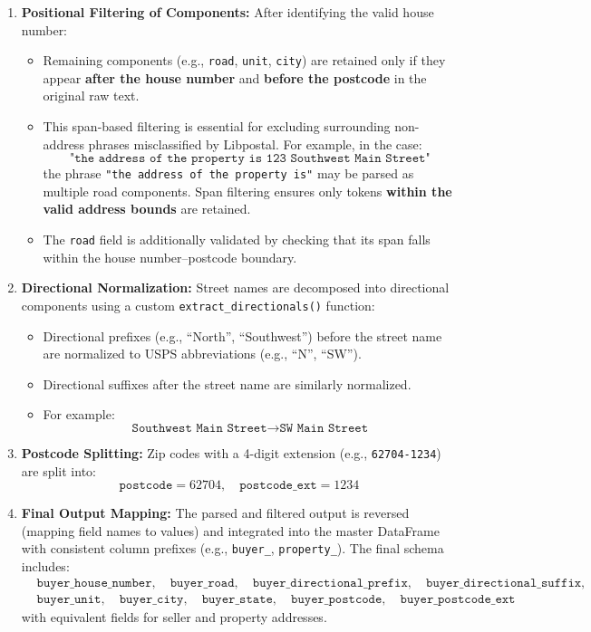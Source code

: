 \documentclass{article}
\begin{document}
\begin{enumerate}
    \item \textbf{Positional Filtering of Components:}  
    After identifying the valid house number:
    \begin{itemize}
        \item Remaining components (e.g., \texttt{road}, \texttt{unit}, \texttt{city}) are retained only if they appear \textbf{after the house number} and \textbf{before the postcode} in the original raw text.
        \item This span-based filtering is essential for excluding surrounding non-address phrases misclassified by Libpostal. For example, in the case:
        \[
        \texttt{"the address of the property is 123 Southwest Main Street"}
        \]
        the phrase \texttt{"the address of the property is"} may be parsed as multiple road components. Span filtering ensures only tokens \textbf{within the valid address bounds} are retained.

        \item The \texttt{road} field is additionally validated by checking that its span falls within the house number–postcode boundary.
    \end{itemize}

    \item \textbf{Directional Normalization:}  
    Street names are decomposed into directional components using a custom \texttt{extract\_directionals()} function:
    \begin{itemize}
        \item Directional prefixes (e.g., ``North'', ``Southwest'') before the street name are normalized to USPS abbreviations (e.g., ``N'', ``SW'').
        \item Directional suffixes after the street name are similarly normalized.
        \item For example:
        \[
        \texttt{Southwest Main Street} \rightarrow \texttt{SW Main Street}
        \]
    \end{itemize}

    \item \textbf{Postcode Splitting:}  
    Zip codes with a 4-digit extension (e.g., \texttt{62704-1234}) are split into:
    \[
    \texttt{postcode} = 62704, \quad \texttt{postcode\_ext} = 1234
    \]

    \item \textbf{Final Output Mapping:}  
    The parsed and filtered output is reversed (mapping field names to values) and integrated into the master DataFrame with consistent column prefixes (e.g., \texttt{buyer\_}, \texttt{property\_}). The final schema includes:
    \begin{align*}
    &\texttt{buyer\_house\_number}, \quad \texttt{buyer\_road}, \quad \texttt{buyer\_directional\_prefix}, \quad \texttt{buyer\_directional\_suffix}, \\
    &\texttt{buyer\_unit}, \quad \texttt{buyer\_city}, \quad \texttt{buyer\_state}, \quad \texttt{buyer\_postcode}, \quad \texttt{buyer\_postcode\_ext}
    \end{align*}
    with equivalent fields for seller and property addresses.


\end{enumerate}
\end{document}

